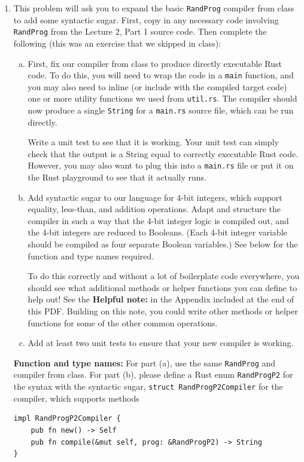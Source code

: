 \documentclass{article}
\theoremstyle{plain}
\begin{document}
\begin{enumerate}

\item
This problem will ask you to expand the basic \texttt{RandProg}
compiler from class to add some syntactic sugar.
First, copy in any necessary code involving \texttt{RandProg}
from the Lecture 2, Part 1 source code.
Then complete the following
(this was an exercise that we skipped in class):

\begin{enumerate}[(a)]
\item First, fix our compiler from class to produce directly executable Rust code.
To do this, you will need to wrap the code in a \texttt{main} function,
and you may also need to inline (or include with the compiled target code)
one or more utility functions we used from \texttt{util.rs}. The compiler should now produce a single \texttt{String} for a \texttt{main.rs} source file, which can be run directly.

Write a unit test to see that it is working. Your unit test can simply check that the output is a String equal to correctly executable Rust code. However, you may also want to plug this into a \texttt{main.rs} file or put it on the Rust playground to see that it actually runs.

\item Add syntactic sugar to our language for 4-bit integers,
which support equality, less-than, and addition operations.
Adapt and structure the compiler in such a way that the 4-bit integer logic is compiled out, and the 4-bit integers are reduced to Booleans.
(Each 4-bit integer variable should be compiled as four separate Boolean variables.)
See below for the function and type names required.

To do this correctly and without a lot of boilerplate code everywhere, you should see what additional methods or helper functions you can define to help out!
See the \textbf{Helpful note:} in the Appendix included at the end of this PDF.
Building on this note, you could write other methods or helper functions for some of the other common operations.

\item Add at least two unit tests to ensure that your new compiler is working.
\end{enumerate}

\textbf{Function and type names:} For part (a), use the same \texttt{RandProg} and compiler from class.
For part (b), please define a Rust enum \texttt{RandProgP2} for the syntax with the syntactic sugar, \texttt{struct RandProgP2Compiler} for the compiler, which supports methods
\begin{verbatim}
impl RandProgP2Compiler {
    pub fn new() -> Self
    pub fn compile(&mut self, prog: &RandProgP2) -> String
}
\end{verbatim}


\end{enumerate}
\end{document}
